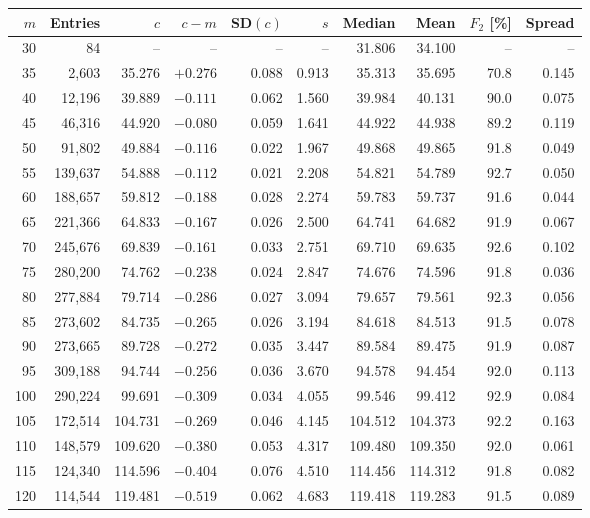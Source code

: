\documentclass[11pt]{article}
\begin{document}
\begin{center}\fontsize{8.5}{10.5}\selectfont\setlength{\tabcolsep}{3.1pt}
\begin{tabular}{rrrrrrrrrr}\toprule
$m$ & Entries & $c$ & $c-m$ & SD$(c)$ & $s$ & Median & Mean & $F_2$ [\%] & Spread\\\midrule
30 & 84 & -- & -- & -- & -- & 31.806 & 34.100 & -- & --\\
35 & 2,603 & 35.276 & $+0.276$ & 0.088 & 0.913 & 35.313 & 35.695 & 70.8 & 0.145\\
40 & 12,196 & 39.889 & $-0.111$ & 0.062 & 1.560 & 39.984 & 40.131 & 90.0 & 0.075\\
45 & 46,316 & 44.920 & $-0.080$ & 0.059 & 1.641 & 44.922 & 44.938 & 89.2 & 0.119\\
50 & 91,802 & 49.884 & $-0.116$ & 0.022 & 1.967 & 49.868 & 49.865 & 91.8 & 0.049\\
55 & 139,637 & 54.888 & $-0.112$ & 0.021 & 2.208 & 54.821 & 54.789 & 92.7 & 0.050\\
60 & 188,657 & 59.812 & $-0.188$ & 0.028 & 2.274 & 59.783 & 59.737 & 91.6 & 0.044\\
65 & 221,366 & 64.833 & $-0.167$ & 0.026 & 2.500 & 64.741 & 64.682 & 91.9 & 0.067\\
70 & 245,676 & 69.839 & $-0.161$ & 0.033 & 2.751 & 69.710 & 69.635 & 92.6 & 0.102\\
75 & 280,200 & 74.762 & $-0.238$ & 0.024 & 2.847 & 74.676 & 74.596 & 91.8 & 0.036\\
80 & 277,884 & 79.714 & $-0.286$ & 0.027 & 3.094 & 79.657 & 79.561 & 92.3 & 0.056\\
85 & 273,602 & 84.735 & $-0.265$ & 0.026 & 3.194 & 84.618 & 84.513 & 91.5 & 0.078\\
90 & 273,665 & 89.728 & $-0.272$ & 0.035 & 3.447 & 89.584 & 89.475 & 91.9 & 0.087\\
95 & 309,188 & 94.744 & $-0.256$ & 0.036 & 3.670 & 94.578 & 94.454 & 92.0 & 0.113\\
100 & 290,224 & 99.691 & $-0.309$ & 0.034 & 4.055 & 99.546 & 99.412 & 92.9 & 0.084\\
105 & 172,514 & 104.731 & $-0.269$ & 0.046 & 4.145 & 104.512 & 104.373 & 92.2 & 0.163\\
110 & 148,579 & 109.620 & $-0.380$ & 0.053 & 4.317 & 109.480 & 109.350 & 92.0 & 0.061\\
115 & 124,340 & 114.596 & $-0.404$ & 0.076 & 4.510 & 114.456 & 114.312 & 91.8 & 0.082\\
120 & 114,544 & 119.481 & $-0.519$ & 0.062 & 4.683 & 119.418 & 119.283 & 91.5 & 0.089\\

\end{tabular}
\end{center}
\end{document}
